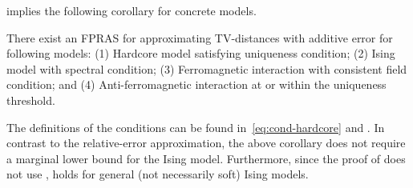  implies the following corollary for concrete models.
\begin{corollary}\label{corollary:apps}
There exist an FPRAS for approximating TV-distances with additive error for following models: (1) Hardcore model satisfying uniqueness condition; (2) Ising model with spectral condition; (3) Ferromagnetic interaction with consistent field condition; and (4) Anti-ferromagnetic interaction at or within the uniqueness threshold.
\end{corollary}
The definitions of the conditions can be found in~\eqref{eq:cond-hardcore} and . 
In contrast to the relative-error approximation, the above corollary does not require a marginal lower bound for the Ising model.
Furthermore, since the proof of  does not use ,  holds for general (not necessarily soft) Ising models.












